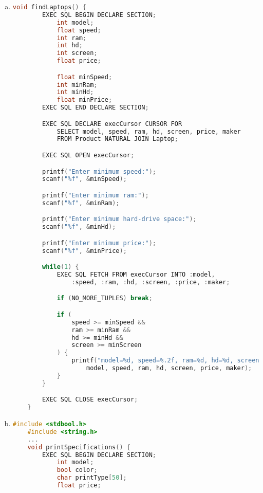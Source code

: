 \documentclass[12pt]{article}
\begin{document}
\begin{enumerate}[1.]
\begin{enumerate}[a)]
\begin{itemize}
\begin{itemize}
\begin{lstlisting}[language=c]
                ...
            }
        }
        \end{lstlisting}

            \end{itemize}
        \end{itemize}

        \item

    \begin{lstlisting}[language=c]
    void findLaptops() {
        EXEC SQL BEGIN DECLARE SECTION;
            int model;
            float speed;
            int ram;
            int hd;
            int screen;
            float price;

            float minSpeed;
            int minRam;
            int minHd;
            float minPrice;
        EXEC SQL END DECLARE SECTION;

        EXEC SQL DECLARE execCursor CURSOR FOR
            SELECT model, speed, ram, hd, screen, price, maker
            FROM Product NATURAL JOIN Laptop;

        EXEC SQL OPEN execCursor;

        printf("Enter minimum speed:");
        scanf("%f", &minSpeed);

        printf("Enter minimum ram:");
        scanf("%f", &minRam);

        printf("Enter minimum hard-drive space:");
        scanf("%f", &minHd);

        printf("Enter minimum price:");
        scanf("%f", &minPrice);

        while(1) {
            EXEC SQL FETCH FROM execCursor INTO :model,
                :speed, :ram, :hd, :screen, :price, :maker;

            if (NO_MORE_TUPLES) break;

            if (
                speed >= minSpeed &&
                ram >= minRam &&
                hd >= minHd &&
                screen >= minScreen
            ) {
                printf("model=%d, speed=%.2f, ram=%d, hd=%d, screen=%d, price=%.2f, maker=%c",
                    model, speed, ram, hd, screen, price, maker);
            }
        }

        EXEC SQL CLOSE execCursor;
    }
    \end{lstlisting}

        \item

    \begin{lstlisting}[language=c]
    #include <stdbool.h>
    #include <string.h>
    ...
    void printSpecifications() {
        EXEC SQL BEGIN DECLARE SECTION;
            int model;
            bool color;
            char printType[50];
            float price;


\end{lstlisting}
\end{enumerate}
\end{enumerate}
\end{document}
